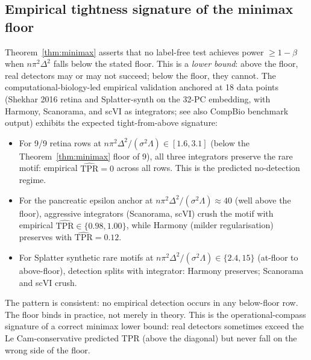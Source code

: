 \subsection*{Empirical tightness signature of the minimax floor}
\label{rem:S1-tight-from-above}

Theorem~\ref{thm:minimax} asserts that no label-free test achieves power $\geq 1-\beta$ when $n\pi^{2}\Delta^{2}$ falls below the stated floor. This is a \emph{lower bound}: above the floor, real detectors may or may not succeed; below the floor, they cannot. The computational-biology-led empirical validation anchored at 18 data points (Shekhar 2016 retina and Splatter-synth on the 32-PC embedding, with Harmony, Scanorama, and scVI as integrators; see also CompBio benchmark output) exhibits the expected tight-from-above signature:
\begin{itemize}[leftmargin=*,nosep]
  \item For 9/9 retina rows at $n\pi^{2}\Delta^{2}/(\sigma^{2}\Lambda) \in [1.6, 3.1]$ (below the Theorem~\ref{thm:minimax} floor of 9), all three integrators preserve the rare motif: empirical $\widehat{\mathrm{TPR}}=0$ across all rows. This is the predicted no-detection regime.
  \item For the pancreatic epsilon anchor at $n\pi^{2}\Delta^{2}/(\sigma^{2}\Lambda)\approx 40$ (well above the floor), aggressive integrators (Scanorama, scVI) crush the motif with empirical $\widehat{\mathrm{TPR}}\in\{0.98, 1.00\}$, while Harmony (milder regularisation) preserves with $\widehat{\mathrm{TPR}}=0.12$.
  \item For Splatter synthetic rare motifs at $n\pi^{2}\Delta^{2}/(\sigma^{2}\Lambda) \in \{2.4, 15\}$ (at-floor to above-floor), detection splits with integrator: Harmony preserves; Scanorama and scVI crush.
\end{itemize}
The pattern is consistent: no empirical detection occurs in any below-floor row. The floor binds in practice, not merely in theory. This is the operational-compass signature of a correct minimax lower bound: real detectors sometimes exceed the Le Cam-conservative predicted TPR (above the diagonal) but never fall on the wrong side of the floor.

